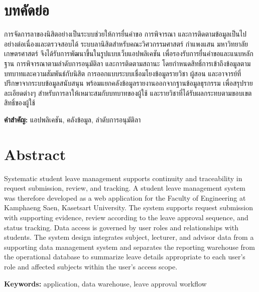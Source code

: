\section*{บทคัดย่อ}
การจัดการลาของนิสิตอย่างเป็นระบบช่วยให้การยื่นคำขอ การพิจารณา
และการติดตามข้อมูลเป็นไปอย่างต่อเนื่องและตรวจสอบได้
ระบบลานิสิตสำหรับคณะวิศวกรรมศาสตร์
กำแพงแสน มหาวิทยาลัยเกษตรศาสตร์ จึงได้รับการพัฒนาขึ้นในรูปแบบเว็บแอปพลิเคชัน
เพื่อรองรับการยื่นคำขอและแนบหลักฐาน การพิจารณาตามลำดับการอนุมัติลา
และการติดตามสถานะ
โดยกำหนดสิทธิ์การเข้าถึงข้อมูลตามบทบาทและความสัมพันธ์กับนิสิต
การออกแบบระบบเชื่อมโยงข้อมูลรายวิชา ผู้สอน
และอาจารย์ที่ปรึกษาจากระบบข้อมูลสนับสนุน
พร้อมแยกคลังข้อมูลรายงานออกจากฐานข้อมูลธุรกรรม
เพื่อสรุปรายละเอียดต่างๆ สำหรับการลาให้เหมาะสมกับบทบาทของผู้ใช้
และรายวิชาที่ได้รับผลกระทบตามขอบเขตสิทธิ์ของผู้ใช้
\par\noindent\textbf{คำสำคัญ:} แอปพลิเคชัน, คลังข้อมูล, ลำดับการอนุมัติลา
\section*{Abstract}
Systematic student leave management supports continuity and traceability in
request submission, review, and tracking. A student leave management system
was therefore developed as a web application for the Faculty of Engineering
at Kamphaeng Saen, Kasetsart University. The system supports request
submission with supporting evidence, review according to the leave approval
sequence, and status tracking. Data access is governed by user roles and
relationships with students. The system design integrates subject, lecturer,
and advisor data from a supporting data management system and separates the
reporting warehouse from the operational database to summarize leave details
appropriate to each user's role and affected subjects within the user's
access scope.
\par\noindent\textbf{Keywords:} application, data warehouse, leave
approval workflow
